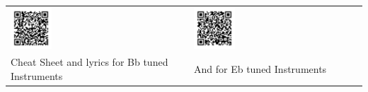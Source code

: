\begin{tabular}{p{} p{} p{}}
  \includegraphics[width=0.25\textwidth]{QR_Codes/QR_BillieJean_Bb.png}
  &
  &
  \includegraphics[width=0.25\textwidth]{QR_Codes/QR_BillieJean_Eb.png}\\                                                     
   Cheat Sheet and lyrics for Bb tuned Instruments
   &
   &
   And for Eb tuned Instruments\\
\end{tabular}